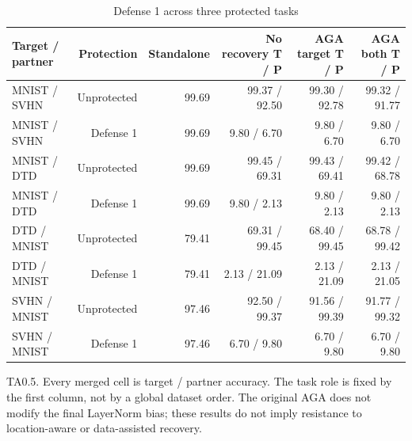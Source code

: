 \begin{table}[!htbp]
\centering
\small
\caption{Defense 1 across three protected tasks}
\label{tab:defense1}
\begin{tabular}{lrrrrr}
\toprule
Target / partner & Protection & Standalone & No recovery T / P & AGA target T / P & AGA both T / P \\
\midrule
MNIST / SVHN & Unprotected & 99.69 & 99.37 / 92.50 & 99.30 / 92.78 & 99.32 / 91.77 \\
MNIST / SVHN & Defense 1 & 99.69 & 9.80 / 6.70 & 9.80 / 6.70 & 9.80 / 6.70 \\
MNIST / DTD & Unprotected & 99.69 & 99.45 / 69.31 & 99.43 / 69.41 & 99.42 / 68.78 \\
MNIST / DTD & Defense 1 & 99.69 & 9.80 / 2.13 & 9.80 / 2.13 & 9.80 / 2.13 \\
DTD / MNIST & Unprotected & 79.41 & 69.31 / 99.45 & 68.40 / 99.45 & 68.78 / 99.42 \\
DTD / MNIST & Defense 1 & 79.41 & 2.13 / 21.09 & 2.13 / 21.09 & 2.13 / 21.05 \\
SVHN / MNIST & Unprotected & 97.46 & 92.50 / 99.37 & 91.56 / 99.39 & 91.77 / 99.32 \\
SVHN / MNIST & Defense 1 & 97.46 & 6.70 / 9.80 & 6.70 / 9.80 & 6.70 / 9.80 \\
\bottomrule
\end{tabular}
\par\vspace{3pt}\begin{minipage}{0.98\linewidth}\footnotesize TA0.5. Every merged cell is target / partner accuracy. The task role is fixed by the first column, not by a global dataset order. The original AGA does not modify the final LayerNorm bias; these results do not imply resistance to location-aware or data-assisted recovery.\end{minipage}
\end{table}

